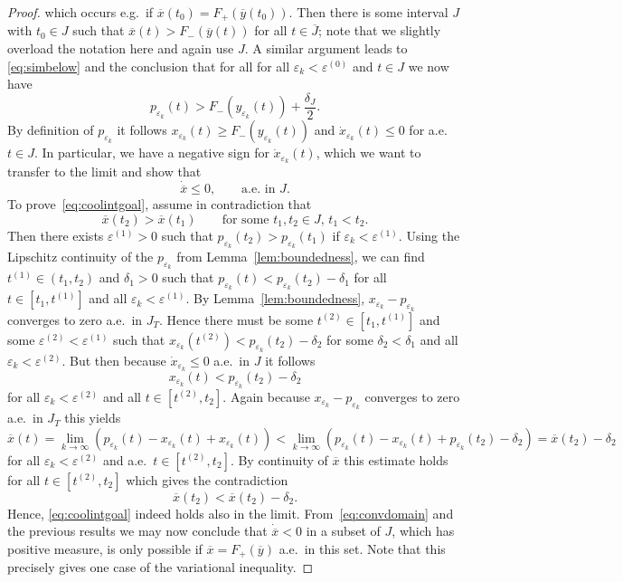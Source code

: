 \documentclass[12pt]{article}
\newcommand{\be}{\begin{equation}}
\newcommand{\ee}{\end{equation}}
\newcommand{\benn}{\begin{equation*}}
\newcommand{\eenn}{\end{equation*}}
\begin{document}
\begin{proof}
which occurs e.g.~if $\overline{x}(t_0) = F_+(\overline{y}(t_0))$. Then there is 
some interval $J$ with $t_0\in J$ such that $\overline{x}(t) > 
F_-(\overline{y}(t))$ for all $t\in \overline{J}$; note that we slightly
overload the notation here and again use $J$. A similar argument leads
to \eqref{eq:simbelow} and the conclusion that for all for all $\varepsilon_k
<\varepsilon^{(0)}$ and $t\in J$ we now have
\benn
p_{\varepsilon_k}(t) > F_-(y_{\varepsilon_k}(t)) + \frac{\delta_J}{2}.
\eenn
By definition of $p_{\varepsilon_k}$ it follows $x_{\varepsilon_k}(t)\geq 
F_-(y_{\varepsilon_k}(t))$ and $\dot{x}_{\varepsilon_k}(t)\leq 0$  for 
a.e.~$t\in J$. In particular, we have a negative sign for 
$\dot{x}_{\varepsilon_k}(t)$, which we want to transfer to the limit
and show that
\be
\label{eq:coolintgoal}
	\dot{\overline{x}} \leq 0,\qquad \text{a.e. in $J$.}
\ee
To prove~\eqref{eq:coolintgoal}, assume in contradiction that
\be
\label{eq:tobecontra}
\overline{x}(t_2) > \overline{x}(t_1)\qquad 
\text{for some $t_1,t_2\in J$, $t_1<t_2$.}
\ee
Then there exists $\varepsilon^{(1)}>0$ such that 
$p_{\varepsilon_k}(t_2)>p_{\varepsilon_k}(t_1)$ if $\varepsilon_k < \varepsilon^{(1)}$.
Using the Lipschitz continuity of the $p_{\varepsilon_k}$ from 
Lemma~\ref{lem:boundedness}, we can find $t^{(1)}\in (t_1,t_2)$ and $\delta_1>0$ 
such that $p_{\varepsilon_k}(t) < p_{\varepsilon_k}(t_2)-\delta_1$ for all 
$t\in [t_1,t^{(1)}]$ and all $\varepsilon_k < \varepsilon^{(1)}$.
By Lemma~\ref{lem:boundedness}, $x_{\varepsilon_k}-p_{\varepsilon_k}$ converges 
to zero a.e.~in $J_T$. Hence there must be some $t^{(2)}\in [t_1,t^{(1)}]$ and 
some $\varepsilon^{(2)}<\varepsilon^{(1)}$ such that $x_{\varepsilon_k}(t^{(2)}) 
< p_{\varepsilon_k}(t_2)-\delta_2$ for some $\delta_2<\delta_1$ and all 
$\varepsilon_k< \varepsilon^{(2)}$. But then because $\dot{x}_{\varepsilon_k}\leq 0$ 
a.e.~in $J$ it follows
\benn
	x_{\varepsilon_k}(t) < p_{\varepsilon_k}(t_2)-\delta_2
\eenn
for all $\varepsilon_k< \varepsilon^{(2)}$ and all $t\in [t^{(2)},t_2]$.
Again because $x_{\varepsilon_k}-p_{\varepsilon_k}$ converges to zero a.e.~in $J_T$ 
this yields
\benn
	\overline{x}(t) = \lim_{k\rightarrow \infty} (p_{\varepsilon_k}(t) 
	- x_{\varepsilon_k}(t) + x_{\varepsilon_k}(t)) < \lim_{k\rightarrow \infty} 
	(p_{\varepsilon_k}(t) - x_{\varepsilon_k}(t) + p_{\varepsilon_k}(t_2) - 
	\delta_2) = \overline{x}(t_2) - \delta_2
\eenn
for all $\varepsilon_k< \varepsilon^{(2)}$ and a.e.~$t\in [t^{(2)},t_2]$. By continuity 
of $\overline{x}$ this estimate holds for all $t\in [t^{(2)},t_2]$ which gives the 
contradiction 
\benn
	\overline{x}(t_2) < \overline{x}(t_2)-\delta_2.
\eenn
Hence, \eqref{eq:coolintgoal} indeed holds also in the limit. From~\eqref{eq:convdomain}
and the previous results we may now conclude that $\dot{\overline{x}}<0$ in a subset of 
$J$, which has positive measure, is only possible if $\overline{x}=F_+(\overline{y})$ 
a.e.~in this set. Note that this precisely gives one case of the variational 
inequality.


\end{proof}
\end{document}
